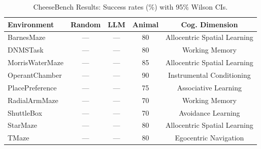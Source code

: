 \begin{table}[t]
\centering
\caption{CheeseBench Results: Success rates (\%) with 95\% Wilson CIs.}
\label{tab:results}
\small
\begin{tabular}{lcccc}
\toprule
Environment & Random & LLM & Animal & Cog. Dimension \\
\midrule
BarnesMaze & — & — & 80 & Allocentric Spatial Learning \\
DNMSTask & — & — & 80 & Working Memory \\
MorrisWaterMaze & — & — & 85 & Allocentric Spatial Learning \\
OperantChamber & — & — & 90 & Instrumental Conditioning \\
PlacePreference & — & — & 75 & Associative Learning \\
RadialArmMaze & — & — & 70 & Working Memory \\
ShuttleBox & — & — & 70 & Avoidance Learning \\
StarMaze & — & — & 80 & Allocentric Spatial Learning \\
TMaze & — & — & 80 & Egocentric Navigation \\
\bottomrule
\end{tabular}
\end{table}